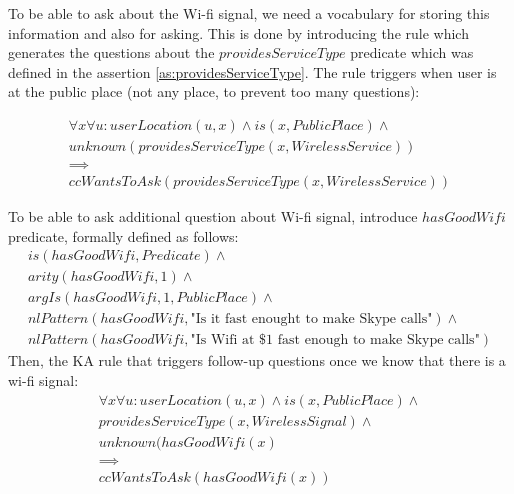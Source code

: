 To be able to ask about the Wi-fi signal, we need a vocabulary for storing this
information and also for asking. This is done by introducing the rule which
generates the questions about the $providesServiceType$ predicate which was
defined in the assertion \ref{as:providesServiceType}. The rule triggers
when user is at the public place (not any place, to prevent too many questions):

\begin{equation}\label{rule:haswifi}
\begin{gathered}
	\forall x\forall u: userLocation(u,x) \land
	is (x,PublicPlace) \land \\
	unknown(providesServiceType(x,WirelessService))\\
	\implies \\
	ccWantsToAsk(providesServiceType(x,WirelessService))
\end{gathered}
\end{equation}

\begin{definition}\label{def:hasGoodWifi}
To be able to ask additional question about Wi-fi signal, introduce 
$hasGoodWifi$ predicate, formally defined as follows:
\begin{equation}\label{as:hasGoodWifi}
\begin{gathered}
	is(hasGoodWifi, Predicate) \land \\
	arity(hasGoodWifi,1) \land \\
	argIs(hasGoodWifi,1,PublicPlace) \land \\
	nlPattern(hasGoodWifi,\text{"Is it fast enought to make Skype calls"})\land\\
	nlPattern(hasGoodWifi,\text{"Is Wifi at \$1 fast enough to make Skype calls"})
\end{gathered}
\end{equation}
Then, the KA rule that triggers follow-up questions once we know that there
is a wi-fi signal:
\begin{equation}\label{rule:hasGoodWifi}
\begin{gathered}
	\forall x\forall u: userLocation(u,x) \land
	is (x,PublicPlace) \land \\
	providesServiceType(x,WirelessSignal) \land \\
	unknown(hasGoodWifi(x) \\
	\implies \\
	ccWantsToAsk(hasGoodWifi(x))
\end{gathered}
\end{equation}
\end{definition}

